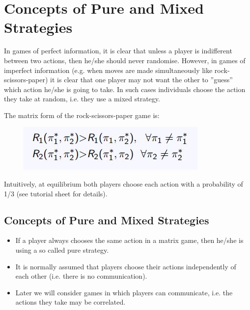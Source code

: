 \documentclass[]{report}
\begin{document}
\newpage
\section{Concepts of Pure and Mixed Strategies}
In games of perfect information, it is clear that unless a player is
indifferent between two actions, then he/she should never
randomise.
However, in games of imperfect information (e.g. when moves are
made simultaneously like rock-scissors-paper) it is clear that one
player may not want the other to ”guess” which action he/she is
going to take.
In such cases individuals choose the action they take at random,
i.e. they use a mixed strategy.

The matrix form of the rock-scissors-paper game is:
\begin{figure}[h!]
\centering
\includegraphics[width=0.7\linewidth]{images/DR7-Slide41}
\caption{}
\label{fig:DR7-Slide41}
\end{figure}

Intuitively, at equilibrium both players choose each action with a
probability of 1/3 (see tutorial sheet for details).

\subsection{Concepts of Pure and Mixed Strategies}
\begin{itemize}
	\item If a player always chooses the same action in a matrix game, then
	he/she is using a so called pure strategy.
	\item It is normally assumed that players choose their actions
	independently of each other (i.e. there is no communication).
	\item Later we will consider games in which players can communicate,
	i.e. the actions they take may be correlated.
\end{itemize}
\end{document}
